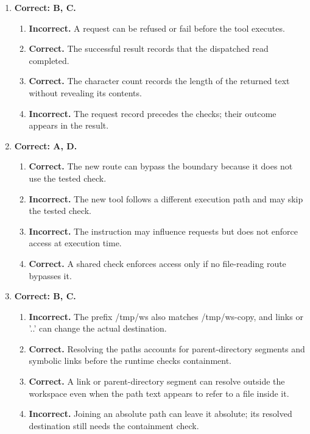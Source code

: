 \begin{enumerate}[start=31,itemsep=0.7\baselineskip]
\item[{\hyperref[exercise:37]{37.}}] \begin{minipage}[t]{\linewidth}
\textbf{Correct: B, C.}
\begin{enumerate}[label=\textnormal{(\Alph*)},leftmargin=*,itemsep=0pt]
\item \textbf{Incorrect.} A request can be refused or fail before the tool executes.
\item \textbf{Correct.} The successful result records that the dispatched read completed.
\item \textbf{Correct.} The character count records the length of the returned text without revealing its contents.
\item \textbf{Incorrect.} The request record precedes the checks; their outcome appears in the result.
\end{enumerate}
\end{minipage}

\item[{\hyperref[exercise:38]{38.}}] \begin{minipage}[t]{\linewidth}
\textbf{Correct: A, D.}
\begin{enumerate}[label=\textnormal{(\Alph*)},leftmargin=*,itemsep=0pt]
\item \textbf{Correct.} The new route can bypass the boundary because it does not use the tested check.
\item \textbf{Incorrect.} The new tool follows a different execution path and may skip the tested check.
\item \textbf{Incorrect.} The instruction may influence requests but does not enforce access at execution time.
\item \textbf{Correct.} A shared check enforces access only if no file-reading route bypasses it.
\end{enumerate}
\end{minipage}

\item[{\hyperref[exercise:39]{39.}}] \begin{minipage}[t]{\linewidth}
\textbf{Correct: B, C.}
\begin{enumerate}[label=\textnormal{(\Alph*)},leftmargin=*,itemsep=0pt]
\item \textbf{Incorrect.} The prefix /tmp/ws also matches /tmp/ws-copy, and links or '..' can change the actual destination.
\item \textbf{Correct.} Resolving the paths accounts for parent-directory segments and symbolic links before the runtime checks containment.
\item \textbf{Correct.} A link or parent-directory segment can resolve outside the workspace even when the path text appears to refer to a file inside it.
\item \textbf{Incorrect.} Joining an absolute path can leave it absolute; its resolved destination still needs the containment check.
\end{enumerate}
\end{minipage}


\end{enumerate}
